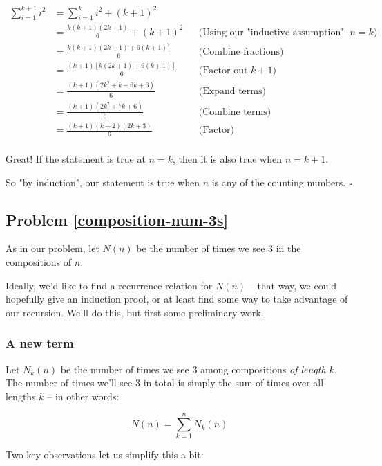 \begin{align*}
\sum_{i=1}^{k+1} i^2 &= \sum_{i=1}^{k} i^2 + (k+1)^2 \\
&= \frac{k(k+1)(2k+1)}{6} + (k+1)^2 && \text{(Using our "inductive assumption" that the statement is true at $n = k$)} \\
&= \frac{k(k+1)(2k+1) + 6(k+1)^2}{6} && \text{(Combine fractions)} \\
&= \frac{(k+1)\left[k(2k+1) + 6(k+1)\right]}{6} && \text{(Factor out $k+1$)} \\
&= \frac{(k+1)(2k^2 + k + 6k + 6)}{6} && \text{(Expand terms)} \\
&= \frac{(k+1)(2k^2 + 7k + 6)}{6} && \text{(Combine terms)} \\
&= \frac{(k+1)(k+2)(2k+3)}{6} && \text{(Factor)} \\
\end{align*}

Great! If the statement is true at $n = k$, then it is also true when $n = k + 1$. 

So "by induction", our statement is true when $n$ is any of the counting numbers. $\square$

\subsection{Problem \ref{composition-num-3s}}

As in our problem, let $N(n)$ be the number of times we see 3 in the compositions of $n$. 

Ideally, we'd like to find a recurrence relation for $N(n)$ -- that way, we could hopefully give an induction proof, or at least find some way to take advantage of our recursion. We'll do this, but first some preliminary work.

\subsubsection{A new term}

Let $N_k(n)$ be the number of times we see 3 among compositions \emph{of length $k$}. The number of times we'll see 3 in total is simply the sum of times over all lengths $k$ -- in other words:

\begin{equation*}
N(n) = \sum_{k=1}^{n} N_k(n)
\end{equation*}

Two key observations let us simplify this a bit:

